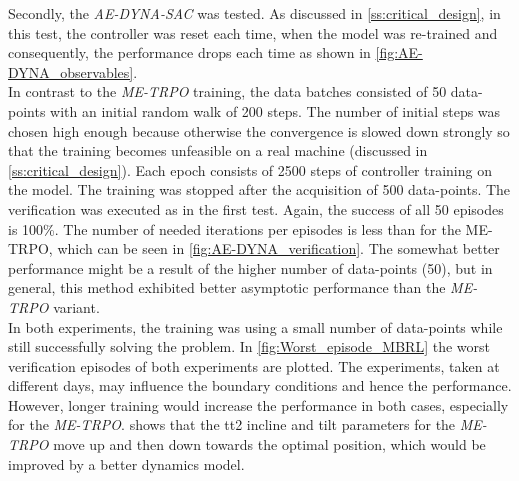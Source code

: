 \documentclass[
reprint,nofootinbib,
amsmath,amssymb,amsfonts,clevref,
aps,
prstab,
]{revtex4-2}
\begin{document}
	Secondly, the \emph{AE-DYNA-SAC} was tested. As discussed in \cref{ss:critical_design}, in this test, the controller was reset each time, when the model was re-trained and consequently, the performance drops each time as shown in \cref{fig:AE-DYNA_observables}.\\
	In contrast to the \emph{ME-TRPO} training, the data batches consisted of 50 data-points with an initial random walk of 200 steps. The number of initial steps was chosen high enough because otherwise the convergence is slowed down strongly so that the training becomes unfeasible on a real machine (discussed in \cref{ss:critical_design}). Each epoch consists of 2500 steps of controller training on the model. The training was stopped after the acquisition of 500 data-points. The verification was executed as in the first test. Again, the success of all 50 episodes is 100\%. The number of needed iterations per episodes is less than for the ME-TRPO, which can be seen in \cref{fig:AE-DYNA_verification}. The somewhat better performance might be a result of the higher number of data-points (50), but in general, this method exhibited better asymptotic performance than the \emph{ME-TRPO} variant.\\
	In both experiments, the training was using a small number of data-points while still successfully solving the problem. In \cref{fig:Worst_episode_MBRL} the worst verification episodes of both experiments are plotted. The experiments, taken at different days, may influence the boundary conditions and hence the performance. However, longer training would increase the performance in both cases, especially for the \emph{ME-TRPO}.  shows that the tt2 incline and tilt parameters for the \emph{ME-TRPO} move up and then down towards the optimal position, which would be improved by a better dynamics model.
\end{document}
